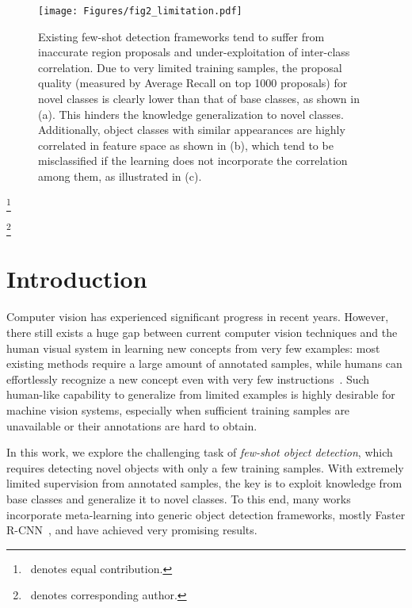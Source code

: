 \documentclass[letterpaper]{article} \usepackage{aaai22}  \usepackage{times}  \usepackage{helvet}  \usepackage{courier}  \usepackage[hyphens]{url}  \usepackage{graphicx} \urlstyle{rm} \def\UrlFont{\rm}  \usepackage{natbib}  \usepackage{caption} \DeclareCaptionStyle{ruled}{labelfont=normalfont,labelsep=colon,strut=off} \frenchspacing  \setlength{\pdfpagewidth}{8.5in}  \setlength{\pdfpageheight}{11in}  \usepackage{algorithm}
\newcommand\blfootnote[1]{\begingroup
\renewcommand\thefootnote{}\footnote{#1}\addtocounter{footnote}{-1}\endgroup
}
\begin{document}
\begin{figure*}[t!] 
\vspace*{-1.66mm}
\begin{center}
   \texttt{[image: Figures/fig2\_limitation.pdf]}
\end{center}
\vspace*{-3.666mm}
\caption{Existing few-shot detection frameworks tend to suffer from inaccurate region proposals and under-exploitation of inter-class correlation. Due to very limited training samples, the proposal quality (measured by Average Recall on top 1000 proposals) for novel classes is clearly lower than that of base classes, as shown in (a). This hinders the knowledge generalization to novel classes. Additionally, object classes with similar appearances are highly correlated in feature space as shown in (b), which tend to be misclassified if the learning does not incorporate the correlation among them, as illustrated in (c).}
\label{fig:fig2_limitation}
\vspace*{-0.5mm}
\end{figure*}


\blfootnote{\, denotes equal contribution.}
\blfootnote{\, denotes corresponding author.}




\section{Introduction}

Computer vision has experienced significant progress in recent years. However, there still exists a huge gap between current computer vision techniques and the human visual system in learning new concepts from very few examples: most existing methods require a large amount of annotated samples, while humans can effortlessly recognize a new concept even with very few instructions~\citep{Landau1988TheIO}. Such human-like capability to generalize from limited examples is highly desirable for machine vision systems, especially when sufficient training samples are unavailable or their annotations are hard to obtain.

In this work, we explore the challenging task of \textit{few-shot object detection}, which requires detecting novel objects with only a few training samples. With extremely limited supervision from annotated samples, the key is to exploit knowledge from base classes and generalize it to novel classes. To this end, many works~\citep{FewshotReweighting,metarcnn,FSDetView,fsod,DenseRelationDistillation} incorporate meta-learning into generic object detection frameworks, mostly Faster R-CNN~\citep{FasterRCNN}, and have achieved very promising results.
\end{document}
